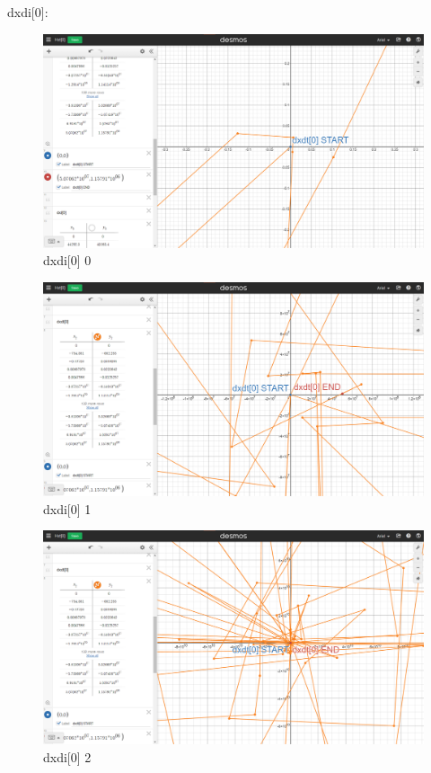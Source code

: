 dxdi[0]:
\begin{figure}[H]
    \includegraphics[width=\columnwidth]{figs/dxdi[0]_0}
    \caption{dxdi[0] 0}
\end{figure}
\begin{figure}[H]
    \includegraphics[width=\columnwidth]{figs/dxdi[0]_1}
    \caption{dxdi[0] 1}
\end{figure}
\begin{figure}[H]
    \includegraphics[width=\columnwidth]{figs/dxdi[0]_2}
    \caption{dxdi[0] 2}
\end{figure}

